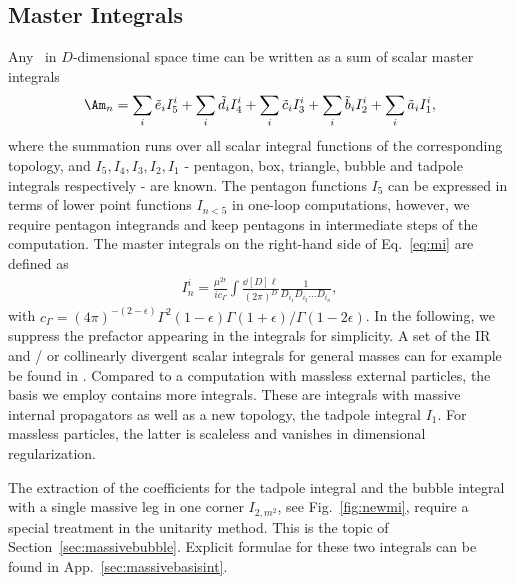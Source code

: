 \subsection{Master Integrals}
\label{sec:scmi}
Any \ola~in $D$-dimensional space time can be written as a sum of scalar master integrals \cite{Melrose1965,Passarino:1978jh,Neerven1984a,Bern1993}
\begin{align}\label{eq:mi}
\Am_n = \sum_i \tilde{e}_i I_5^i+\sum_i \tilde{d}_i  I_4^i+ \sum_i \tilde{c}_i I_3^i+ \sum_i \tilde{b}_i I_2^i+ \sum_i \tilde{a}_i  I_1^i,
\end{align}
where the summation runs over all scalar integral functions of the
corresponding topology, and $I_5,I_4,I_3,I_2,I_1$ - pentagon, box,
triangle, bubble and tadpole integrals respectively - are known. The pentagon functions $I_5$ can be expressed in terms of lower point functions $I_{n<5}$ in one-loop computations, however, we require pentagon integrands and keep pentagons in intermediate steps of the computation. The master integrals on the right-hand side of Eq.~\eqref{eq:mi} are defined as 
\begin{align}
I_n^i = \frac{\mu^{2\epsilon}}{i c_\Gamma} \int \frac{\dd[D]{\ell}}{(2\pi)^{D}} \frac{1}{D_{i_1}D_{i_2}\dots D_{i_n}},
\end{align}
with $c_\Gamma=(4\pi)^{-(2-\epsilon)}\Gamma^2(1-\epsilon)\Gamma(1+\epsilon)/\Gamma(1-2\epsilon)$. In the following, we suppress the prefactor appearing in the integrals for simplicity. A set
of the IR and / or collinearly divergent scalar integrals for general masses can for example be found in \cite{Ellis:2007qk}. Compared to a computation
with massless external particles, the basis we employ contains more integrals. These are integrals with massive
internal propagators as well as a new topology, the tadpole integral
$I_1$. For massless particles, the latter is scaleless and vanishes in dimensional
regularization. 

The extraction of the coefficients for the tadpole
integral and the bubble integral with
a single massive leg in one corner $I_{2,m^2}$, see Fig.~\ref{fig:newmi}, require a special
treatment in the unitarity method. This is the topic of
Section~\ref{sec:massivebubble}. Explicit formulae for these two integrals can
be found in App.~\ref{sec:massivebasisint}. 

